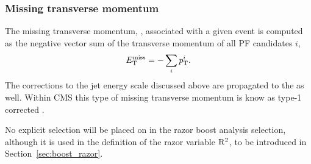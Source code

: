 \subsubsection{Missing transverse momentum \label{sec:object_met}}

The missing transverse momentum, \ETm, associated with a given event is computed as the negative
vector sum of the transverse momentum of all PF candidates $i$,
\begin{equation}
  E_{\mathrm{T}}^{\text{miss}} = - \sum_i p_{\mathrm{T}}^i .
\end{equation}
The corrections to the jet energy scale discussed above are propagated to the \ETm as well. 
Within CMS this type of missing transverse momentum is know as type-1 corrected \ETm.

No explicit selection will be placed on \ETm in the razor boost analysis selection, although it is
used in the definition of the razor variable $\mathrm{R^2}$, to be introduced in
Section~\ref{sec:boost_razor}.



